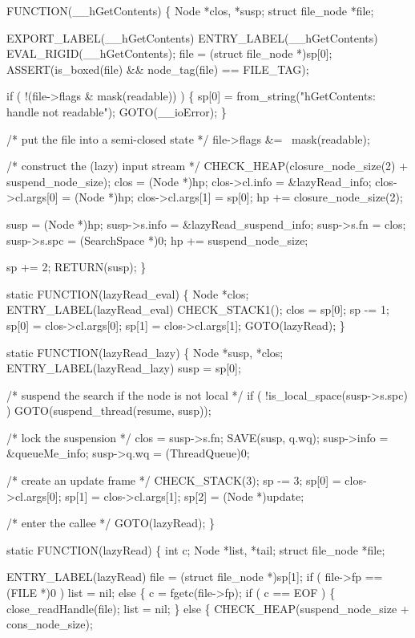 FUNCTION(__hGetContents)
\{
    Node                *clos, *susp;
    struct file_node    *file;

    EXPORT_LABEL(__hGetContents)
 ENTRY_LABEL(__hGetContents)
    EVAL_RIGID(__hGetContents);
    file = (struct file_node *)sp[0];
    ASSERT(is_boxed(file) && node_tag(file) == FILE_TAG);

    if ( !(file->flags & mask(readable)) )
    \{
        sp[0] = from_string("hGetContents: handle not readable");
        GOTO(__ioError);
    \}

    /* put the file into a semi-closed state */
    file->flags &= ~mask(readable);

    /* construct the (lazy) input stream */
    CHECK_HEAP(closure_node_size(2) + suspend_node_size);
    clos             = (Node *)hp;
    clos->cl.info    = &lazyRead_info;
    clos->cl.args[0] = (Node *)hp;
    clos->cl.args[1] = sp[0];
    hp              += closure_node_size(2);

    susp         = (Node *)hp;
    susp->s.info = &lazyRead_suspend_info;
    susp->s.fn   = clos;
    susp->s.spc  = (SearchSpace *)0;
    hp          += suspend_node_size;

    sp += 2;
    RETURN(susp);
\}

static
FUNCTION(lazyRead_eval)
\{
    Node *clos;
 ENTRY_LABEL(lazyRead_eval)
    CHECK_STACK1();
    clos  = sp[0];
    sp   -= 1;
    sp[0] = clos->cl.args[0];
    sp[1] = clos->cl.args[1];
    GOTO(lazyRead);
\}

static
FUNCTION(lazyRead_lazy)
\{
    Node *susp, *clos;
 ENTRY_LABEL(lazyRead_lazy)
    susp = sp[0];

    /* suspend the search if the node is not local */
    if ( !is_local_space(susp->s.spc) )
        GOTO(suspend_thread(resume, susp));

    /* lock the suspension */
    clos = susp->s.fn;
    SAVE(susp, q.wq);
    susp->info = &queueMe_info;
    susp->q.wq = (ThreadQueue)0;

    /* create an update frame */
    CHECK_STACK(3);
    sp   -= 3;
    sp[0] = clos->cl.args[0];
    sp[1] = clos->cl.args[1];
    sp[2] = (Node *)update;

    /* enter the callee */
    GOTO(lazyRead);
\}

static
FUNCTION(lazyRead)
\{
    int              c;
    Node             *list, *tail;
    struct file_node *file;

 ENTRY_LABEL(lazyRead)
    file = (struct file_node *)sp[1];
    if ( file->fp == (FILE *)0 )
        list = nil;
    else
    \{
        c = fgetc(file->fp);
        if ( c == EOF )
        \{
            close_readHandle(file);
            list = nil;
        \}
        else
        \{
            CHECK_HEAP(suspend_node_size + cons_node_size);

